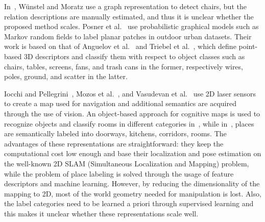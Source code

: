 In~\cite{ObjectsOffice}, W\"unstel and Moratz use a graph
representation to detect chairs, but the relation descriptions are
manually estimated, and thus it is unclear whether the proposed method
scales. Posner et al.~\cite{PosnerCumminsNewman08} use probabilistic
graphical models such as Markov random fields to label planar patches
in outdoor urban datasets. Their work is based on that of Anguelov et
al.~\cite{Anguelov05discriminativelearning} and Triebel et
al.~\cite{TriebelAMN07}, which define point-based 3D descriptors and
classify them with respect to object classes such as chairs, tables,
screens, fans, and trash cans in the former, %
respectively wires, poles, ground, and scatter in the
latter.%


Iocchi and Pellegrini~\cite{IocchiISPRS}, Mozos et
al.~\cite{MartinezMozos07a}, and Vasudevan et
al.~\cite{vasudevan07cognitive} use 2D laser sensors to create a map
used for navigation and additional semantics are acquired through the
use of vision. An object-based approach for cognitive maps is used to
recognize objects and classify rooms in different categories
in~\cite{vasudevan07cognitive}, while
in~\cite{Mozos2006iros,MartinezMozos07a}, places are semantically
labeled into doorways, kitchens, corridors, rooms.  The advantages of
these representations are straightforward: they keep the computational
cost low enough and base their localization and pose estimation on the
well-known 2D SLAM (Simultaneous Localization and Mapping) problem,
while the problem of place labeling is solved through the usage of
feature descriptors and machine learning.  However, by reducing the
dimensionality of the mapping to 2D, most of the world geometry needed
for manipulation is lost.  Also, the label categories need to be
learned a priori through supervised learning and this makes it unclear
whether these representations scale well.

